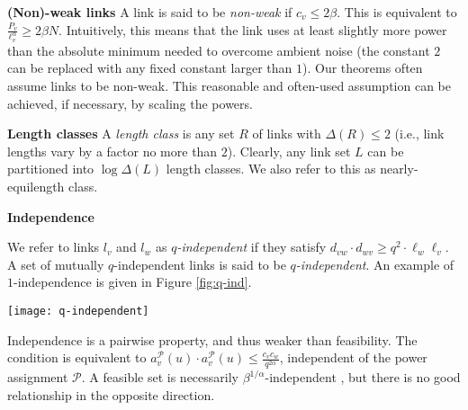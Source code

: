\documentclass[11pt]{amsart}
\newcommand{\cal}[1]{\mathcal{#1}}
\newcommand{\header}[1]{\smallskip\noindent\textbf{#1}\quad}
\def\calP{{\cal P}}
\def\calP{{\cal P}}   \def\calM{{\cal M}}   \def\calU{{\cal U}}   \newcommand{\PCopt}{\overline{OPT}}
\begin{document}
\header{(Non)-weak links}
A link is said to be \emph{non-weak} if $c_v \le 2\beta$.
This is equivalent to $\frac{P_v}{\ell_v^{\alpha}} \ge 2 \beta N$.
Intuitively, this means that the link uses at least slightly more power than the absolute minimum
needed to overcome ambient noise (the constant $2$ can be replaced with any fixed constant larger than $1$). Our theorems often assume links to 
be non-weak. This reasonable and often-used assumption \cite{DBLP:conf/infocom/AndrewsD09,Dinitz2010,Goussevskaia2008Local,KV10} 
can be achieved, if necessary, by scaling the powers.

\header{Length classes}
A \emph{length class} is any set $R$ of links with $\Delta(R) \leq 2$ (i.e., link 
lengths vary by a factor no more than $2$). Clearly, any link set $L$ can be partitioned
into $\log \Delta(L)$ length classes. We also refer to this as nearly-equilength class.



\header{Independence}
\iffalse
A \emph{$\delta$-signal} set is one where the
affectance of any link is at most $1/\delta$.


\begin{proposition}[\cite{HW09}]
Any feasible set $S$ can be partitioned into
$\lceil 2p \rceil^2$ $p$-signal sets.
\label{prop:signal-length}
\end{proposition}

\begin{lemma}[\cite{us:esa09full}]
Links that belong to the same $q^\alpha$-signal slot are $q$-independent.
\label{lem:ind-separation}
\end{lemma}
\fi
We refer to links $l_v$ and $l_w$ as
\emph{$q$-independent} if they satisfy
$d_{vw} \cdot d_{wv} \ge q^2 \cdot \ell_w \ell_v$.
A set of mutually $q$-independent links is said to be \emph{$q$-independent}. An example of $1$-independence is given in Figure \ref{fig:q-ind}.

\begin{figure*}[ht]
	\begin{center}
		\texttt{[image: q-independent]}
	\end{center}
	\caption{Links $l_1$ and $l_2$ are $1.92$-independent. Set $\{l_1,l_2,l_3\}$ is $1.43$-independent.}\label{fig:q-ind}
\end{figure*}


Independence is a pairwise property, and thus weaker than feasibility.
The condition is equivalent to $a_v^\calP(u) \cdot a_v^\calP(u) \le \frac{c_v c_w}{q^{2\alpha}}$,
independent of the power assignment $\calP$.
A feasible set is necessarily $\beta^{1/\alpha}$-independent
  \cite{us:esa09full}, but there is no good relationship in the opposite
  direction.
\end{document}
